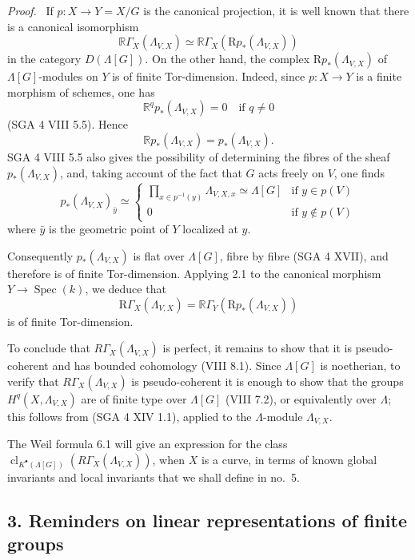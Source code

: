 \documentclass[11pt]{article}
\newenvironment{prooftext}[1][Proof]{\par\noindent\emph{#1.}\ }{\par\medskip}
\DeclareMathOperator{\Spec}{Spec}
\newcommand{\R}{\mathrm{R}}
\providecommand{\R}{\mathrm R}
\providecommand{\Spec}{\operatorname{Spec}}
\providecommand{\Spec}{\operatorname{Spec}}
\providecommand{\Spec}{\operatorname{Spec}}
\providecommand{\Spec}{\operatorname{Spec}}
\begin{document}
\begin{prooftext}
If $p:X\to Y=X/G$ is the canonical projection, it is well known that there is a canonical isomorphism
\[
\mathbb{R}\Gamma_X(\Lambda_{V,X})\simeq \mathbb{R}\Gamma_X(\R p_*(\Lambda_{V,X}))
\]
in the category $D(\Lambda[G])$. On the other hand, the complex $\R p_*(\Lambda_{V,X})$ of $\Lambda[G]$-modules on $Y$ is of finite Tor-dimension. Indeed, since $p:X\to Y$ is a finite morphism of schemes, one has
\[
\mathbb{R}^q p_*(\Lambda_{V,X})=0\quad\text{if }q\ne0
\]
(SGA 4 VIII 5.5). Hence
\[
\mathbb{R} p_*(\Lambda_{V,X})=p_*(\Lambda_{V,X}).
\]
SGA 4 VIII 5.5 also gives the possibility of determining the fibres of the sheaf $p_*(\Lambda_{V,X})$, and, taking account of the fact that $G$ acts freely on $V$, one finds
\[
p_*(\Lambda_{V,X})_{\bar y}\simeq
\begin{cases}
\displaystyle \prod_{x\in p^{-1}(y)}\Lambda_{V,X,x}\simeq \Lambda[G]& \text{if } y\in p(V)\\[1em]
0& \text{if } y\notin p(V)
\end{cases}
\]
where $\bar y$ is the geometric point of $Y$ localized at $y$.

Consequently $p_*(\Lambda_{V,X})$ is flat over $\Lambda[G]$, fibre by fibre (SGA 4 XVII), and therefore is of finite Tor-dimension. Applying 2.1 to the canonical morphism $Y\to\Spec(k)$, we deduce that
\[
\R\Gamma_X(\Lambda_{V,X})=\mathbb{R}\Gamma_Y(\R p_*(\Lambda_{V,X}))
\]
is of finite Tor-dimension.

To conclude that $R\Gamma_X(\Lambda_{V,X})$ is perfect, it remains to show that it is pseudo-coherent and has bounded cohomology (VIII 8.1). Since $\Lambda[G]$ is noetherian, to verify that $R\Gamma_X(\Lambda_{V,X})$ is pseudo-coherent it is enough to show that the groups $H^q(X,\Lambda_{V,X})$ are of finite type over $\Lambda[G]$ (VIII 7.2), or equivalently over $\Lambda$; this follows from (SGA 4 XIV 1.1), applied to the $\Lambda$-module $\Lambda_{V,X}$.
\end{prooftext}

The Weil formula 6.1 will give an expression for the class
$\operatorname{cl}_{K^\bullet(\Lambda[G])}(R\Gamma_X(\Lambda_{V,X}))$,
when $X$ is a curve, in terms of known global invariants and local invariants
that we shall define in no.~5.

\subsection*{3. Reminders on linear representations of finite groups}
\end{document}
